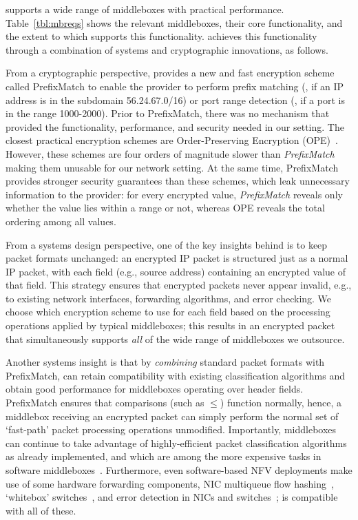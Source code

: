 \sys supports a wide range of middleboxes with practical performance.  Table~\ref{tbl:mbreqs} shows the relevant middleboxes, their core functionality, and the extent to which \sys supports this functionality.
\sys achieves this functionality through a combination of systems and cryptographic innovations, as follows.
   
From a cryptographic perspective, \sys provides a new and fast encryption scheme called PrefixMatch  to enable the provider to perform prefix matching (\eg{}, if an IP address is in the subdomain 56.24.67.0/16) or port range detection (\eg{}, if a port is in the range 1000-2000). Prior to PrefixMatch, there was no mechanism that provided the functionality, performance, and  security needed in our setting. The closest practical encryption schemes are Order-Preserving Encryption (OPE)~\cite{boldyreva:ope,popa:mope,popa:cryptdb}. 
However, these schemes are four orders of magnitude slower than {\it PrefixMatch} making them unusable for our network setting. At the same time, PrefixMatch provides stronger security guarantees than these schemes, which leak unnecessary information to the provider: for every encrypted value, {\em PrefixMatch} reveals only whether the value lies within a range or not, whereas OPE reveals the total ordering among all values.

  From a systems design perspective, one of the key insights behind \sys is to keep packet formats unchanged: an encrypted IP packet is structured just as a normal IP packet, with each field (e.g., source address) containing an encrypted value of that field.
  This strategy ensures that encrypted packets never appear invalid, e.g., to existing network interfaces, forwarding algorithms, and error checking. 
  We choose which encryption scheme to use for each field based on the processing operations applied by typical middleboxes; this results in an encrypted packet that simultaneously supports {\it all} of the wide range of middleboxes we outsource.
  
  Another systems insight is that by {\it combining} standard packet formats with PrefixMatch, \sys can retain compatibility with existing classification algorithms and obtain good performance for middleboxes operating over header fields.
  PrefixMatch ensures that comparisons (such as $\leq$) function normally, hence, a middlebox receiving an encrypted packet can simply perform the normal set of `fast-path' packet processing operations unmodified.
  Importantly, middleboxes can continue to take advantage of highly-efficient packet classification algorithms~\cite{packet_classif} as already implemented, and which are among the more expensive tasks in software middleboxes~\cite{comb, ethan-paper}.
  Furthermore, even software-based NFV deployments make use of some hardware forwarding components, \eg{} NIC multiqueue flow hashing~\cite{nicdocument}, `whitebox' switches~\cite{whitebox}, and error detection in NICs and switches~\cite{nicdocument, ciscov6}; \sys is compatible with all of these.

